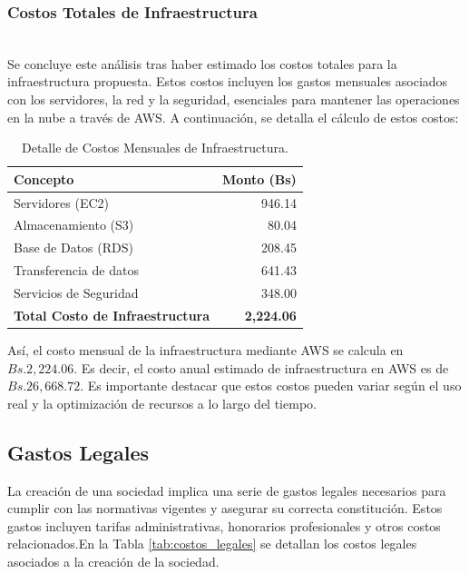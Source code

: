 \subsubsection{Costos Totales de Infraestructura}\hfill\\ 
\indent
Se concluye este análisis tras haber estimado los costos totales para la infraestructura propuesta. Estos costos incluyen los gastos mensuales asociados con los servidores, la red y la seguridad, esenciales para mantener las operaciones en la nube a través de AWS. A continuación, se detalla el cálculo de estos costos:

\begin{table}[ht]
    \caption{Detalle de Costos Mensuales de Infraestructura.}
    \label{tab:costos_infraestructura}
    \centering
    \begin{tabularx}{\textwidth}{|X|r|} 
        \hline
        \textbf{Concepto} & \textbf{Monto (Bs)} \\ \hline
        Servidores (EC2) & 946.14 \\ 
        Almacenamiento (S3) & 80.04 \\ 
        Base de Datos (RDS) & 208.45 \\ 
        Transferencia de datos & 641.43 \\ 
        Servicios de Seguridad & 348.00 \\ \hline
        \textbf{Total Costo de Infraestructura} & \textbf{2,224.06} \\ \hline
    \end{tabularx}
\end{table}

Así, el costo mensual de la infraestructura mediante AWS se calcula en $Bs.2,224.06$. Es decir, el costo anual estimado de infraestructura en AWS es de $Bs.26,668.72$. Es importante destacar que estos costos pueden variar según el uso real y la optimización de recursos a lo largo del tiempo.

\subsection{Gastos Legales}

La creación de una sociedad implica una serie de gastos legales necesarios para cumplir con las normativas vigentes y asegurar su correcta constitución. Estos gastos incluyen tarifas administrativas, honorarios profesionales y otros costos relacionados.En la Tabla \ref{tab:costos_legales} se detallan los costos legales asociados a la creación de la sociedad.

